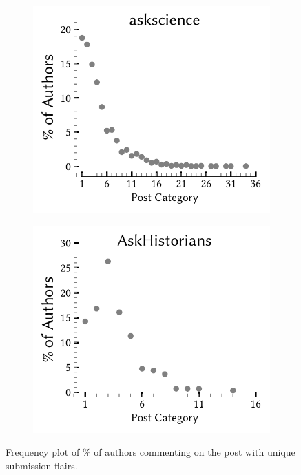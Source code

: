 \begin{figure}[tbh]
\centering
  \begin{subfigure}{0.5\textwidth}
  \centering
\includegraphics[scale=0.62]{images/Flair_frequency.pdf}
\end{subfigure}%
  \begin{subfigure}{0.5\textwidth}
  \centering
\includegraphics[scale=0.62]{images/Flair_frequency_askhistory.pdf}
\end{subfigure}
\caption{Frequency plot of \% of authors commenting on the post with unique submission flairs.}
\label{fig:flair}
\end{figure}

